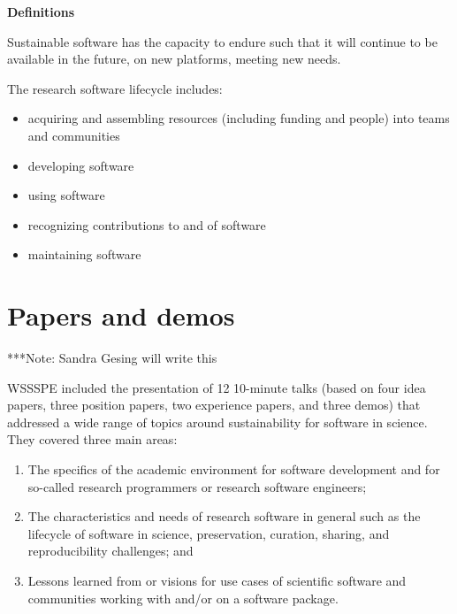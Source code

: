 \documentclass[11pt, oneside]{amsart}
\newcommand{\note}[1]{ {\textcolor{blueish}    { ***Note:      #1 }}}
\begin{document}
{\bf Definitions}

Sustainable software has the capacity to endure such that it will continue to be available in the future, on new platforms, meeting new needs.

The research software lifecycle includes:
\begin{itemize}
\item acquiring and assembling resources (including funding and people) into teams and communities
\item developing software
\item using software
\item recognizing contributions to and of software
\item maintaining software
\end{itemize}


\section{Papers and demos} \label{sec:papers}

\note{Sandra Gesing will write this}

WSSSPE included the presentation of 12 10-minute talks (based on four idea papers, three position papers,
two experience papers, and three demos) that addressed a wide range of topics around
sustainability for software in science. They covered three main areas:
\begin{enumerate}
\item The specifics of the academic environment for software development and for so-called
research programmers or research software engineers;
\item The characteristics and needs of research software in general such as the lifecycle of
software in science, preservation, curation, sharing, and reproducibility challenges; and
\item Lessons learned from or visions for use cases of scientific software and communities
working with and\slash or on a software package.
\end{enumerate}
\end{document}
